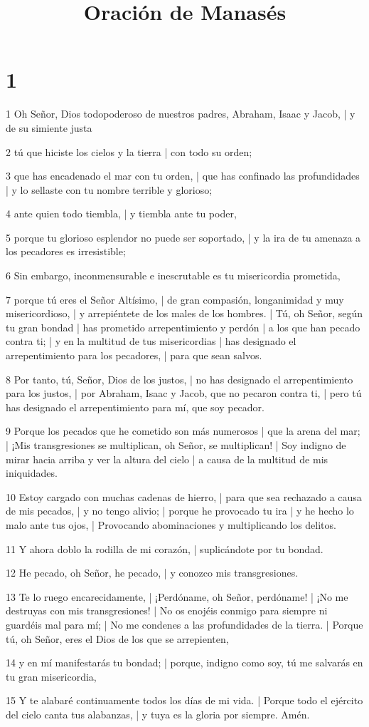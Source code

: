 

\title{Oración de Manasés}

\chapter{1}

\par 1 Oh Señor, Dios todopoderoso de nuestros padres, Abraham, Isaac y Jacob, | y de su simiente justa
\par 2 tú que hiciste los cielos y la tierra | con todo su orden;
\par 3 que has encadenado el mar con tu orden, | que has confinado las profundidades | y lo sellaste con tu nombre terrible y glorioso;
\par 4 ante quien todo tiembla, | y tiembla ante tu poder,
\par 5 porque tu glorioso esplendor no puede ser soportado, | y la ira de tu amenaza a los pecadores es irresistible;
\par 6 Sin embargo, inconmensurable e inescrutable es tu misericordia prometida,
\par 7 porque tú eres el Señor Altísimo, | de gran compasión, longanimidad y muy misericordioso, | y arrepiéntete de los males de los hombres. | Tú, oh Señor, según tu gran bondad | has prometido arrepentimiento y perdón | a los que han pecado contra ti; | y en la multitud de tus misericordias | has designado el arrepentimiento para los pecadores, | para que sean salvos.
\par 8 Por tanto, tú, Señor, Dios de los justos, | no has designado el arrepentimiento para los justos, | por Abraham, Isaac y Jacob, que no pecaron contra ti, | pero tú has designado el arrepentimiento para mí, que soy pecador.
\par 9 Porque los pecados que he cometido son más numerosos | que la arena del mar; | ¡Mis transgresiones se multiplican, oh Señor, se multiplican! | Soy indigno de mirar hacia arriba y ver la altura del cielo | a causa de la multitud de mis iniquidades.
\par 10 Estoy cargado con muchas cadenas de hierro, | para que sea rechazado a causa de mis pecados, | y no tengo alivio; | porque he provocado tu ira | y he hecho lo malo ante tus ojos, | Provocando abominaciones y multiplicando los delitos.
\par 11 Y ahora doblo la rodilla de mi corazón, | suplicándote por tu bondad.
\par 12 He pecado, oh Señor, he pecado, | y conozco mis transgresiones.
\par 13 Te lo ruego encarecidamente, | ¡Perdóname, oh Señor, perdóname! | ¡No me destruyas con mis transgresiones! | No os enojéis conmigo para siempre ni guardéis mal para mí; | No me condenes a las profundidades de la tierra. | Porque tú, oh Señor, eres el Dios de los que se arrepienten,
\par 14 y en mí manifestarás tu bondad; | porque, indigno como soy, tú me salvarás en tu gran misericordia,
\par 15 Y te alabaré continuamente todos los días de mi vida. | Porque todo el ejército del cielo canta tus alabanzas, | y tuya es la gloria por siempre. Amén.

